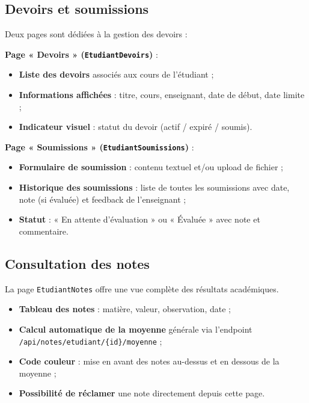 \subsection{Devoirs et soumissions}

Deux pages sont dédiées à la gestion des devoirs :

\vspace{0.3cm}

\textbf{Page « Devoirs » (\texttt{EtudiantDevoirs})} :
\begin{itemize}[noitemsep]
    \item \textbf{Liste des devoirs} associés aux cours de l'étudiant ;
    \item \textbf{Informations affichées} : titre, cours, enseignant, date de début, date limite ;
    \item \textbf{Indicateur visuel} : statut du devoir (actif / expiré / soumis).
\end{itemize}

\vspace{0.3cm}

\textbf{Page « Soumissions » (\texttt{EtudiantSoumissions})} :
\begin{itemize}[noitemsep]
    \item \textbf{Formulaire de soumission} : contenu textuel et/ou upload de fichier ;
    \item \textbf{Historique des soumissions} : liste de toutes les soumissions avec date, note (si évaluée) et feedback de l'enseignant ;
    \item \textbf{Statut} : « En attente d'évaluation » ou « Évaluée » avec note et commentaire.
\end{itemize}

\subsection{Consultation des notes}

La page \texttt{EtudiantNotes} offre une vue complète des résultats académiques.

\begin{itemize}[noitemsep]
    \item \textbf{Tableau des notes} : matière, valeur, observation, date ;
    \item \textbf{Calcul automatique de la moyenne} générale via l'endpoint \texttt{/api/notes/etudiant/\{id\}/moyenne} ;
    \item \textbf{Code couleur} : mise en avant des notes au-dessus et en dessous de la moyenne ;
    \item \textbf{Possibilité de réclamer} une note directement depuis cette page.
\end{itemize}

